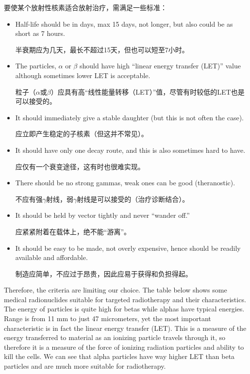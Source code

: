 \documentclass[dvipsnames, svgnames,a4paper,11pt]{article}
\begin{document}
要使某个放射性核素适合放射治疗，需满足一些标准：
\begin{itemize}
      \item Half-life should be in days, max 15 days, not longer, but also could be as short as 7 hours.

            半衰期应为几天，最长不超过15天，但也可以短至7小时。

      \item The particles, $\alpha$ or $\beta$ should have high “linear energy transfer (LET)” value although sometimes lower LET is acceptable.

            粒子（$\alpha$或$\beta$）应具有高“线性能量转移（LET）”值，尽管有时较低的LET也是可以接受的。

      \item It should immediately give a stable daughter (but this is not often the case).

            应立即产生稳定的子核素（但这并不常见）。

      \item It should have only one decay route, and this is also sometimes hard to have.

            应仅有一个衰变途径，这有时也很难实现。

      \item There should be no strong gammas, weak ones can be good (theranostic).

            不应有强$\gamma$射线，弱$\gamma$射线是可以接受的（治疗诊断结合）。


      \item It should be held by vector tightly and never “wander off.”

            应紧紧附着在载体上，绝不能“游离”。

      \item It should be easy to be made, not overly expensive, hence should be readily available and affordable.

            制造应简单，不应过于昂贵，因此应易于获得和负担得起。

\end{itemize}
Therefore, the criteria are limiting our choice. The table below shows some medical radionuclides suitable for targeted radiotherapy and their characteristics. The energy of particles is quite high for betas while alphas have typical energies. Range is from 11 mm to just 47 micrometers, yet the most important characteristic is in fact the linear energy transfer (LET). This is a measure of the energy transferred to material as an ionizing particle travels through it, so therefore it is a measure of the force of ionizing radiation particles and ability to kill the cells. We can see that alpha particles have way higher LET than beta particles and are much more suitable for radiotherapy.
\end{document}
